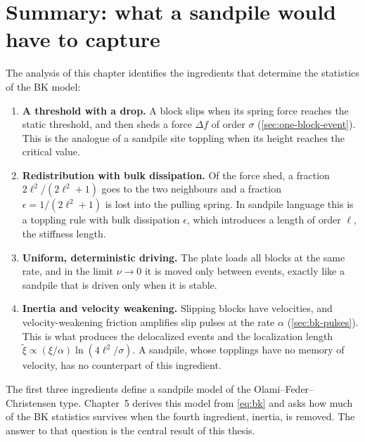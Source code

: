 \section{Summary: what a sandpile would have to capture}
\label{sec:bk-summary}

The analysis of this chapter identifies the ingredients that determine the statistics of the BK model:
\begin{enumerate}
  \item \textbf{A threshold with a drop.} A block slips when its spring force reaches the static threshold, and then sheds a force $\Delta f$ of order $\sigma$ (\cref{sec:one-block-event}).
    This is the analogue of a sandpile site toppling when its height reaches the critical value.
  \item \textbf{Redistribution with bulk dissipation.} Of the force shed, a fraction $2\ell^2/(2\ell^2+1)$ goes to the two neighbours and a fraction
    $\epsilon = 1/(2\ell^2+1)$ is lost into the pulling spring. In sandpile language this is a toppling rule with bulk dissipation $\epsilon$, which introduces a length
    of order $\ell$, the stiffness length.
  \item \textbf{Uniform, deterministic driving.} The plate loads all blocks at the same rate, and in the limit $\nu\to0$ it is moved only between events, exactly like a
    sandpile that is driven only when it is stable.
  \item \textbf{Inertia and velocity weakening.} Slipping blocks have velocities, and velocity-weakening friction amplifies slip pulses at the rate $\alpha$
    (\cref{sec:bk-pulses}). This is what produces the delocalized events and the localization length $\tilde\xi\propto(\xi/\alpha)\ln(4\ell^2/\sigma)$. A sandpile, whose
    topplings have no memory of velocity, has no counterpart of this ingredient.
\end{enumerate}
The first three ingredients define a sandpile model of the Olami--Feder--Christensen type. Chapter~5 derives this model from \cref{eq:bk} and asks how much of the BK
statistics survives when the fourth ingredient, inertia, is removed. The answer to that question is the central result of this thesis.
